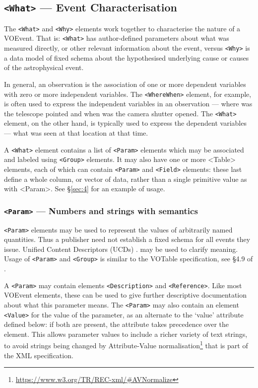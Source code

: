 \documentclass[11pt,a4paper]{ivoa}
\begin{document}
\subsection{{\tt <What>} --- Event Characterisation}
\label{sec:3.3}
The {\tt <What>} and {\tt <Why>} elements work together to characterise the 
nature of a VOEvent. That is: {\tt <What>} has author-defined parameters about 
what was measured directly, or other relevant information about the event, 
versus {\tt <Why>} is a data model of fixed schema about the hypothesised 
underlying cause or causes of the astrophysical event. 

In general, an observation is the association of one or more dependent variables 
with zero or more independent variables. The {\tt <WhereWhen>} element, for 
example, is often used to express the independent variables in an observation 
--- where was the telescope pointed and when was the camera shutter opened. The 
{\tt <What>} element, on the other hand, is typically used to express the 
dependent variables --- what was seen at that location at that time. 

A {\tt <What>} element contains a list of {\tt <Param>} elements which may be 
associated and labeled using {\tt <Group>} elements. It may also have one or 
more <Table> elements, each of which can contain {\tt <Param>} and {\tt <Field>} 
elements: these last define a whole column, or vector of data, rather than a 
single primitive value as with <Param>. See \S\ref{sec:4} for an example of 
usage. 

\subsubsection{{\tt <Param>} --- Numbers and strings with semantics}
\label{sec:3.3.1}
{\tt <Param>} elements may be used to represent the values of arbitrarily named 
quantities. Thus a publisher need not establish a fixed schema for all events 
they issue. Unified Content Descriptors (UCDs) \citep{2018ivoa.spec.0527P}.
may be used to clarify meaning. Usage of {\tt <Param>} and {\tt <Group>} is 
similar to the VOTable specification, see \S4.9 of \citep{2019ivoa.spec.1021O}. 

A {\tt <Param>} may contain elements {\tt <Description>} and {\tt <Reference>}. 
Like most VOEvent elements, these can be used to give further descriptive 
documentation about what this parameter means. The {\tt <Param>} may also 
contain an element {\tt <Value>} for the value of the parameter, as an alternate 
to the `value' attribute defined below: if both are present, the attribute takes 
precedence over the element. This allows parameter values to include a richer 
variety of text strings, to avoid strings being changed by Attribute-Value 
normalisation\footnote{\url{https://www.w3.org/TR/REC-xml/\#AVNormalize}} that 
is part of the XML specification. 
\end{document}
